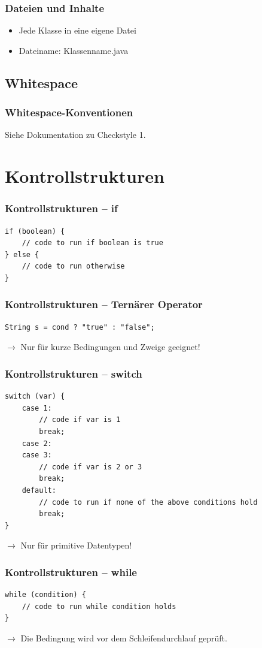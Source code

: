 \documentclass{beamer}
\begin{document}
\begin{frame}
\frametitle{Dateien und Inhalte}
\begin{itemize}
\item Jede Klasse in eine eigene Datei
\item Dateiname: Klassenname.java
\end{itemize}
\end{frame}

\subsection{Whitespace}
\begin{frame}
\frametitle{Whitespace-Konventionen}
Siehe Dokumentation zu Checkstyle 1.
\end{frame}

\section{Kontrollstrukturen}
\begin{frame}[fragile]
\frametitle{Kontrollstrukturen -- if}
\begin{verbatim}
if (boolean) {
    // code to run if boolean is true
} else {
    // code to run otherwise
}
\end{verbatim}
\end{frame}

\begin{frame}[fragile]
\frametitle{Kontrollstrukturen -- Tern\"{a}rer Operator}
\begin{verbatim}
String s = cond ? "true" : "false";
\end{verbatim}
$\rightarrow$ Nur f\"{u}r kurze Bedingungen und Zweige geeignet!
\end{frame}

\begin{frame}[fragile]
\frametitle{Kontrollstrukturen -- switch}
\begin{verbatim}
switch (var) {
    case 1:
        // code if var is 1
        break;
    case 2:
    case 3:
        // code if var is 2 or 3
        break;
    default:
        // code to run if none of the above conditions hold
        break;
}
\end{verbatim}
\pause
$\rightarrow$ Nur f\"{u}r primitive Datentypen!
\end{frame}

\begin{frame}[fragile]
\frametitle{Kontrollstrukturen -- while}
\begin{verbatim}
while (condition) {
    // code to run while condition holds
}
\end{verbatim}
$\rightarrow$ Die Bedingung wird vor dem Schleifendurchlauf gepr\"{u}ft.
\end{frame}
\end{document}
